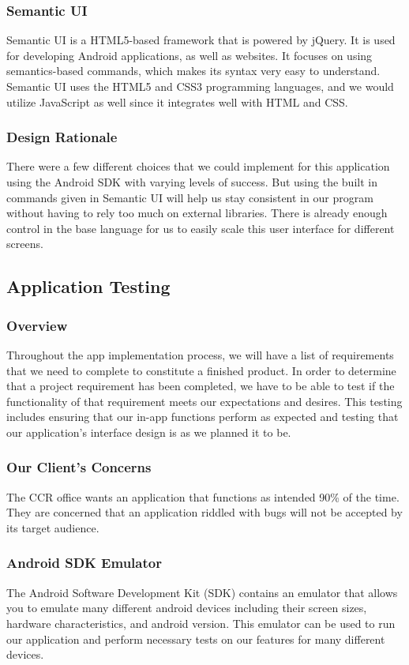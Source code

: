 \documentclass[draftclsnofoot, onecolumn, 10pt, compsoc]{IEEEtran}
\begin{document}
			\subsubsection{Semantic UI}
				Semantic UI is a HTML5-based framework that is powered by jQuery. It is used for developing Android applications, as well as websites. It focuses on using semantics-based commands, which makes its syntax very easy to understand. Semantic UI uses the HTML5 and CSS3 programming languages, and we would utilize JavaScript as well since it integrates well with HTML and CSS.
				~\cite{Semantic_UI}
				~\cite{Semantic_UI2}
			\subsubsection{Design Rationale}
				There were a few different choices that we could implement for this application using the Android SDK with varying levels of success. But using the built in commands given in Semantic UI will help us stay consistent in our program without having to rely too much on external libraries. There is already enough control in the base language for us to easily scale this user interface for different screens.

		\subsection{Application Testing}
			\subsubsection{Overview}
				Throughout the app implementation process, we will have a list of requirements that we need to complete to constitute a finished product. In order to determine that a project requirement has been completed, we have to be able to test if the functionality of that requirement meets our expectations and desires. This testing includes ensuring that our in-app functions perform as expected and testing that our application's interface design is as we planned it to be.
			\subsubsection{Our Client's Concerns}
				The CCR office wants an application that functions as intended 90\% of the time. They are concerned that an application riddled with bugs will not be accepted by its target audience.
			\subsubsection{Android SDK Emulator}
				The Android Software Development Kit (SDK) contains an emulator that allows you to emulate many different android devices including their screen sizes, hardware characteristics, and android version. This emulator can be used to run our application and perform necessary tests on our features for many different devices.
				~\cite{Android_SDK_Emulator}
\end{document}
